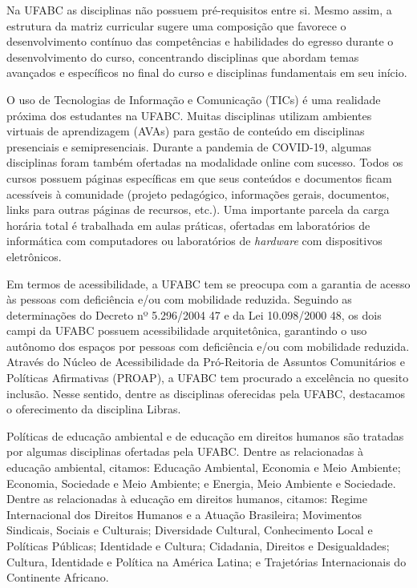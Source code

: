 Na UFABC as disciplinas não possuem pré-requisitos entre si.
Mesmo assim, a estrutura da matriz curricular sugere uma composição que
favorece o desenvolvimento contínuo das competências e habilidades do egresso
durante o desenvolvimento do curso, concentrando disciplinas que abordam temas
avançados e específicos no final do curso e disciplinas fundamentais em seu
início.

O uso de Tecnologias de Informação e Comunicação (TICs) é uma realidade próxima
dos estudantes na UFABC.
Muitas disciplinas utilizam ambientes virtuais de aprendizagem (AVAs) para
gestão de conteúdo em disciplinas presenciais e semipresenciais.
Durante a pandemia de COVID-19, algumas disciplinas foram também ofertadas na
modalidade online com sucesso.
Todos os cursos possuem páginas específicas em que seus conteúdos e documentos
ficam acessíveis à comunidade (projeto pedagógico, informações gerais,
documentos, links para outras páginas de recursos, etc.).
Uma importante parcela da carga horária total é trabalhada em aulas práticas,
ofertadas em laboratórios de informática com computadores ou laboratórios de
{\it hardware} com dispositivos eletrônicos.

Em termos de acessibilidade, a UFABC tem se preocupa com a garantia de acesso
às pessoas com deficiência e/ou com mobilidade reduzida. 
Seguindo as determinações do Decreto nº 5.296/2004 47 e da Lei 10.098/2000 48,
os dois campi da UFABC possuem acessibilidade arquitetônica, garantindo o uso
autônomo dos espaços por pessoas com deficiência e/ou com mobilidade reduzida.
Através do Núcleo de Acessibilidade da Pró-Reitoria de Assuntos Comunitários e
Políticas Afirmativas (PROAP), a UFABC tem procurado a excelência no quesito
inclusão.
Nesse sentido, dentre as disciplinas oferecidas pela UFABC, destacamos o
oferecimento da disciplina Libras.

Políticas de educação ambiental e de educação em direitos humanos são tratadas
por algumas disciplinas ofertadas pela UFABC.
Dentre as relacionadas à educação ambiental, citamos: Educação Ambiental,
Economia e Meio Ambiente; Economia, Sociedade e Meio Ambiente; e Energia, Meio
Ambiente e Sociedade.
Dentre as relacionadas à educação em direitos humanos, citamos: Regime
Internacional dos Direitos Humanos e a Atuação Brasileira; Movimentos
Sindicais, Sociais e Culturais; Diversidade Cultural, Conhecimento Local e
Políticas Públicas; Identidade e Cultura; Cidadania, Direitos e Desigualdades;
Cultura, Identidade e Política na América Latina; e Trajetórias Internacionais
do Continente Africano.



